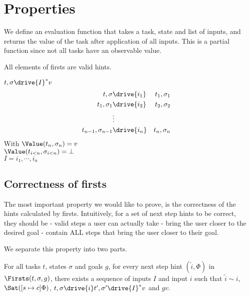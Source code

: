 
\section{Properties}
\label{sec:properties}

We define an evaluation function that takes a task, state and list of inputs,
and returns the value of the task after application of all inputs.
This is a partial function since not all tasks have an observable value.

All elements of firsts are valid hints.

\begin{definition}[Evaluate]
  $t,\sigma\drive{I}^* v$
  \begin{align*}
    t,\sigma             & \drive{i_1} & t_1,\sigma_1\\
    t_1,\sigma_1         & \drive{i_2} & t_2,\sigma_2\\
                         & \vdots   & \\
    t_{n-1},\sigma_{n-1} & \drive{i_n} & t_n,\sigma_n
  \end{align*}
  With $\Value(t_n,\sigma_n)=v$\\
  $\Value(t_{i<n},\sigma_{i<n})=\bot$\\
  $I=i_1,\cdots,i_n$
\end{definition}

\subsection{Correctness of firsts}

The most important property we would like to prove, is the correctness of the hints calculated by firsts.
Intuitively, for a set of next step hints to be correct, they should be
- valid steps a user can actually take
- bring the user closer to the desired goal
- contain ALL steps that bring the user closer to their goal.

We separate this property into two parts.


\begin{lemma}
  \label{lem:soundfirsts}

For all tasks $t$, states $\sigma$ and goals $g$,
for every next step hint $(\tilde{i},\Phi)$ in $\Firsts(t,\sigma,g)$,
there exists a sequence of inputs $I$ and input $i$ such that $\tilde{i}\sim i$,
$\Sat([s\mapsto c]\Phi)$, $t,\sigma\drive{i} t',\sigma'\drive{I}^* v$ and $gv$.
\end{lemma}

